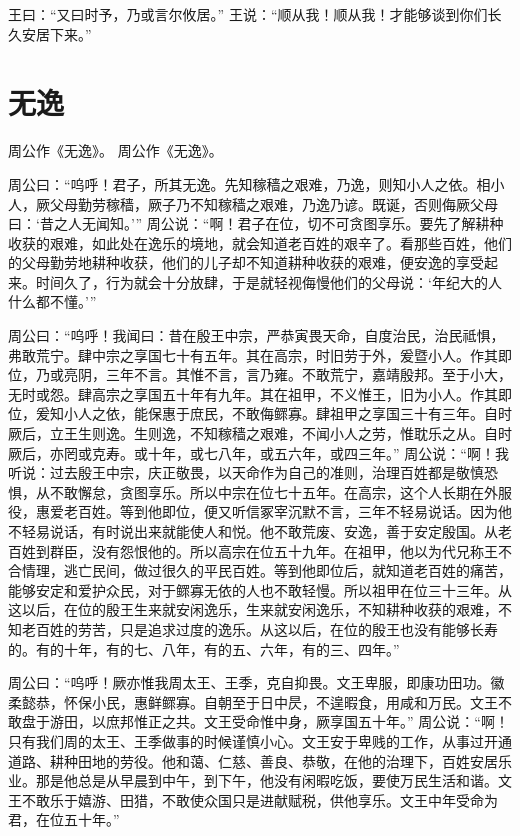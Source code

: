 \documentclass[a4paper,12pt,UTF8,twoside]{ctexbook}
\begin{document}
王曰：“又曰时予，乃或言尔攸居。”
王说：“顺从我！顺从我！才能够谈到你们长久安居下来。”

\chapter{无逸}

周公作《无逸》。
周公作《无逸》。

周公曰：“呜呼！君子，所其无逸。先知稼穑之艰难，乃逸，则知小人之依。相小人，厥父母勤劳稼穑，厥子乃不知稼穑之艰难，乃逸乃谚。既诞，否则侮厥父母曰：‘昔之人无闻知。’”
周公说：“啊！君子在位，切不可贪图享乐。要先了解耕种收获的艰难，如此处在逸乐的境地，就会知道老百姓的艰辛了。看那些百姓，他们的父母勤劳地耕种收获，他们的儿子却不知道耕种收获的艰难，便安逸的享受起来。时间久了，行为就会十分放肆，于是就轻视侮慢他们的父母说：‘年纪大的人什么都不懂。’”

周公曰：“呜呼！我闻曰：昔在殷王中宗，严恭寅畏天命，自度治民，治民祗惧，弗敢荒宁。肆中宗之享国七十有五年。其在高宗，时旧劳于外，爰暨小人。作其即位，乃或亮阴，三年不言。其惟不言，言乃雍。不敢荒宁，嘉靖殷邦。至于小大，无时或怨。肆高宗之享国五十年有九年。其在祖甲，不义惟王，旧为小人。作其即位，爰知小人之依，能保惠于庶民，不敢侮鳏寡。肆祖甲之享国三十有三年。自时厥后，立王生则逸。生则逸，不知稼穑之艰难，不闻小人之劳，惟耽乐之从。自时厥后，亦罔或克寿。或十年，或七八年，或五六年，或四三年。”
周公说：“啊！我听说：过去殷王中宗，庆正敬畏，以天命作为自己的准则，治理百姓都是敬慎恐惧，从不敢懈怠，贪图享乐。所以中宗在位七十五年。在高宗，这个人长期在外服役，惠爱老百姓。等到他即位，便又听信冢宰沉默不言，三年不轻易说话。因为他不轻易说话，有时说出来就能使人和悦。他不敢荒废、安逸，善于安定殷国。从老百姓到群臣，没有怨恨他的。所以高宗在位五十九年。在祖甲，他以为代兄称王不合情理，逃亡民间，做过很久的平民百姓。等到他即位后，就知道老百姓的痛苦，能够安定和爱护众民，对于鳏寡无依的人也不敢轻慢。所以祖甲在位三十三年。从这以后，在位的殷王生来就安闲逸乐，生来就安闲逸乐，不知耕种收获的艰难，不知老百姓的劳苦，只是追求过度的逸乐。从这以后，在位的殷王也没有能够长寿的。有的十年，有的七、八年，有的五、六年，有的三、四年。”

周公曰：“呜呼！厥亦惟我周太王、王季，克自抑畏。文王卑服，即康功田功。徽柔懿恭，怀保小民，惠鲜鳏寡。自朝至于日中昃，不遑暇食，用咸和万民。文王不敢盘于游田，以庶邦惟正之共。文王受命惟中身，厥享国五十年。”
周公说：“啊！只有我们周的太王、王季做事的时候谨慎小心。文王安于卑贱的工作，从事过开通道路、耕种田地的劳役。他和蔼、仁慈、善良、恭敬，在他的治理下，百姓安居乐业。那是他总是从早晨到中午，到下午，他没有闲暇吃饭，要使万民生活和谐。文王不敢乐于嬉游、田猎，不敢使众国只是进献赋税，供他享乐。文王中年受命为君，在位五十年。”
\end{document}
